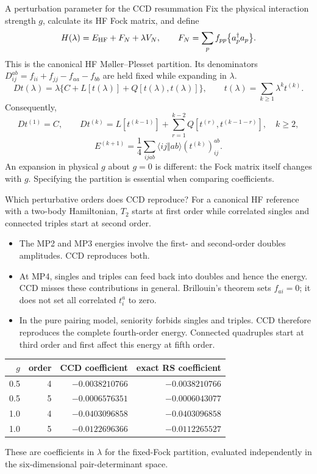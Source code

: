 \documentclass[aspectratio=169,10pt]{beamer}
\newcommand{\cre}[1]{a_{#1}^{\dagger}}
\newcommand{\ann}[1]{a_{#1}}
\newcommand{\no}[1]{\bigl\{#1\bigr\}}
\newcommand{\as}[4]{\langle #1#2\Vert #3#4\rangle}
\begin{document}
\begin{frame}{A perturbation parameter for the CCD resummation}
\small
Fix the physical interaction strength $g$, calculate its HF Fock matrix, and define
\[
 H(\lambda)=E_{\rm HF}+F_N+\lambda V_N,\qquad
 F_N=\sum_p f_{pp}\no{\cre p\ann p}.
\]
This is the canonical HF M\o{}ller--Plesset partition. Its denominators $D_{ij}^{ab}=f_{ii}+f_{jj}-f_{aa}-f_{bb}$ are held fixed while expanding in $\lambda$.
\[
 D t(\lambda)=\lambda\{C+L[t(\lambda)]+Q[t(\lambda),t(\lambda)]\},
 \qquad t(\lambda)=\sum_{k\ge1}\lambda^k t^{(k)}.
\]
Consequently,
\[
 Dt^{(1)}=C,\qquad
 Dt^{(k)}=L[t^{(k-1)}]+\sum_{r=1}^{k-2}Q[t^{(r)},t^{(k-1-r)}],
 \quad k\ge2,
\]
\[
 E^{(k+1)}=\frac14\sum_{ijab}\as{i}{j}{a}{b}(t^{(k)})_{ij}^{ab}.
\]
An expansion in physical $g$ about $g=0$ is different: the Fock matrix itself changes with $g$. Specifying the partition is essential when comparing coefficients.
\end{frame}

\begin{frame}{Which perturbative orders does CCD reproduce?}
\small
For a canonical HF reference with a two-body Hamiltonian, $T_2$ starts at first order while correlated singles and connected triples start at second order.
\begin{itemize}
\item The MP2 and MP3 energies involve the first- and second-order doubles amplitudes. CCD reproduces both.
\item At MP4, singles and triples can feed back into doubles and hence the energy. CCD misses these contributions in general. Brillouin's theorem sets $f_{ai}=0$; it does not set all correlated $t_i^a$ to zero.
\item In the pure pairing model, seniority forbids singles and triples. CCD therefore reproduces the complete fourth-order energy. Connected quadruples start at third order and first affect this energy at fifth order.
\end{itemize}
\begin{center}
\begin{tabular}{rrrr}
\toprule
$g$ & order & CCD coefficient & exact RS coefficient\\
\midrule
0.5 & 4 & $-0.0038210766$ & $-0.0038210766$\\
0.5 & 5 & $-0.0006576351$ & $-0.0006043077$\\
1.0 & 4 & $-0.0403096858$ & $-0.0403096858$\\
1.0 & 5 & $-0.0122696366$ & $-0.0112265527$\\
\bottomrule
\end{tabular}
\end{center}
These are coefficients in $\lambda$ for the fixed-Fock partition, evaluated independently in the six-dimensional pair-determinant space.
\end{frame}
\end{document}
